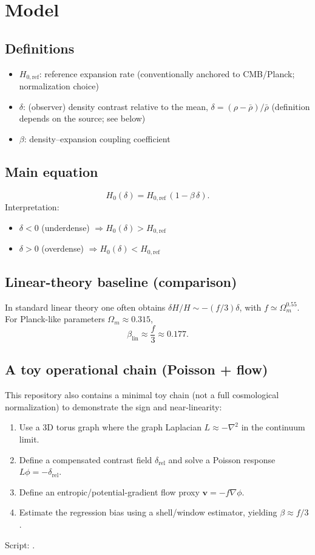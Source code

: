 \documentclass[11pt]{article}
\begin{document}
\section{Model}

\subsection{Definitions}
\begin{itemize}
  \item $H_{0,\mathrm{ref}}$: reference expansion rate (conventionally anchored to CMB/Planck; normalization choice)
  \item $\delta$: (observer) density contrast relative to the mean,
        $\delta=(\rho-\bar\rho)/\bar\rho$ (definition depends on the source; see below)
  \item $\beta$: density--expansion coupling coefficient
\end{itemize}

\subsection{Main equation}
\[
H_0(\delta)=H_{0,\mathrm{ref}}\,(1-\beta\,\delta).
\]
Interpretation:
\begin{itemize}
  \item $\delta<0$ (underdense) $\Rightarrow H_0(\delta) > H_{0,\mathrm{ref}}$
  \item $\delta>0$ (overdense) $\Rightarrow H_0(\delta) < H_{0,\mathrm{ref}}$
\end{itemize}

\subsection{Linear-theory baseline (comparison)}
In standard linear theory one often obtains $\delta H/H \sim -(f/3)\delta$,
with $f\simeq \Omega_m^{0.55}$. For Planck-like parameters $\Omega_m\approx 0.315$,
\[
\beta_{\mathrm{lin}}\approx \frac{f}{3}\approx 0.177.
\]

\subsection{A toy operational chain (Poisson + flow)}
This repository also contains a minimal toy chain (not a full cosmological normalization) to
demonstrate the sign and near-linearity:
\begin{enumerate}
  \item Use a 3D torus graph where the graph Laplacian $L\approx -\nabla^2$ in the continuum limit.
  \item Define a compensated contrast field $\delta_{\mathrm{rel}}$ and solve a Poisson response $L\phi=-\delta_{\mathrm{rel}}$.
  \item Define an entropic/potential-gradient flow proxy $\mathbf v=-f\nabla\phi$.
  \item Estimate the regression bias using a shell/window estimator, yielding $\beta\approx f/3$.
\end{enumerate}
Script: .
\end{document}
